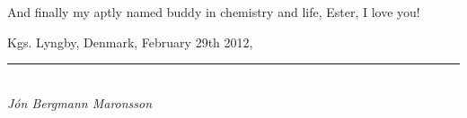 And finally my aptly named buddy in chemistry and life, Ester, I love you!


\vspace{1em}
\begin{flushright}
Kgs. Lyngby, Denmark, February 29th 2012,\\

\vspace{2em}

\rule{50mm}{0.1pt}\\
\textit{J\'on Bergmann Maronsson}
\end{flushright}
